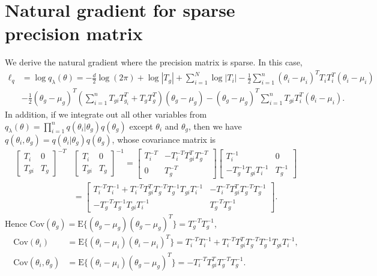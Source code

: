 \documentclass{statsoc}
\newcommand\E{{\text{E}}}
\newcommand\Cov{{\text{Cov}}}
\begin{document}
\section{Natural gradient for sparse precision matrix} \label{S4}
We derive the natural gradient where the precision matrix is sparse.  In this case,
\[
\begin{aligned}
\ell_q &= \log q_\lambda (\theta) = -\frac{d}{2} \log (2\pi) + \log|T_g| + \sum_{i=1}^N \log |T_i| - \frac{1}{2} \sum_{i=1}^n  (\theta_i - \mu_i)^T T_i T_i^T (\theta_i - \mu_i) \\
&- \frac{1}{2} (\theta_g - \mu_g)^T \left( \sum_{i=1}^n T_{gi} T_{g_i}^T + T_g T_g^T \right)  (\theta_g - \mu_g) - (\theta_g - \mu_g)^T \sum_{i=1}^n T_{gi} T_i^T  (\theta_i - \mu_i).
\end{aligned}
\]
In addition, if we integrate out all other variables from $q_\lambda(\theta) = \prod_{i=1}^n q(\theta_i|\theta_g) q(\theta_g)$ except $\theta_i$ and $\theta_g$, then we have $q(\theta_i, \theta_g) = q(\theta_i|\theta_g) q(\theta_g)$, whose covariance matrix is 
\[
\begin{aligned}
\begin{bmatrix} T_i & 0 \\ T_{gi} & T_g \end{bmatrix}^{-T} 
&\begin{bmatrix} T_i & 0 \\ T_{gi} & T_g \end{bmatrix}^{-1} 
= \begin{bmatrix} T_i^{-T} & -T_i^{-T}T_{gi}^T T_g^{-T}   \\ 0 & T_g^{-T} \end{bmatrix}
\begin{bmatrix} T_i^{-1} & 0 \\ -T_g^{-1} T_{gi} T_i^{-1} & T_g^{-1} \end{bmatrix} \\
&= \begin{bmatrix} T_i^{-T}  T_i^{-1} + T_i^{-T}T_{gi}^T T_g^{-T} T_g^{-1} T_{gi} T_i^{-1} & -T_i^{-T}T_{gi}^T T_g^{-T}  T_g^{-1} \\[1mm]
 -T_g^{-T} T_g^{-1} T_{gi} T_i^{-1} & T_g^{-T} T_g^{-1} \end{bmatrix}.
\end{aligned}
\]
Hence $\Cov(\theta_g) = \E\{ (\theta_g - \mu_g)(\theta_g - \mu_g)^T\} = T_g^{-T} T_g^{-1}$, 
\[
\begin{aligned}
\Cov(\theta_i) &= \E\{(\theta_i - \mu_i) (\theta_i - \mu_i)^T\} = T_i^{-T}  T_i^{-1} + T_i^{-T}T_{gi}^T T_g^{-T} T_g^{-1} T_{gi} T_i^{-1}, \\
\Cov(\theta_i, \theta_g) &= \E\{(\theta_i - \mu_i)(\theta_g - \mu_g)^T \}
= -T_i^{-T}T_{gi}^T T_g^{-T}  T_g^{-1}.
\end{aligned}
\]
\end{document}
